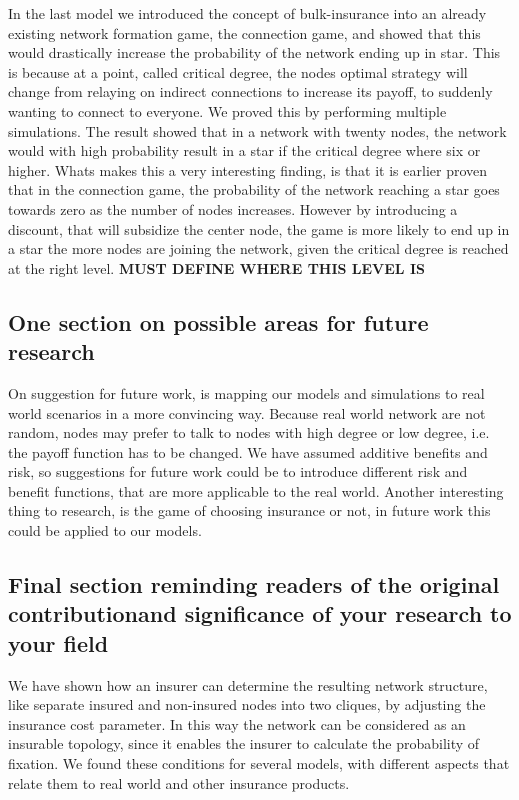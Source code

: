 In the last model we introduced the concept of bulk-insurance into an already existing network formation game, the connection game, and showed that this would drastically increase the probability of the network ending up in star. This is because at a point, called critical degree, the nodes optimal strategy will change from relaying on indirect connections to increase its payoff, to suddenly wanting to connect to everyone. 
We proved this by performing multiple simulations. The result showed that in a network with twenty nodes, the network would with high probability result in a star if the critical degree where six or higher. 
Whats makes this a very interesting finding, is that it is earlier proven that in the connection game, the probability of the network reaching a star goes towards zero as the number of nodes increases. However by introducing a discount, that will subsidize the center node, the game is more likely to end up in a star the more nodes are joining the network, given the critical degree is reached at the right level. \textbf{MUST DEFINE WHERE THIS LEVEL IS}

\subsection{One section on possible areas for future research}
On suggestion for future work, is mapping our models and simulations to real world scenarios in a more convincing way. Because real world network are not random, nodes may prefer to talk to nodes with high degree or low degree, i.e. the payoff function has to be changed. We have assumed additive benefits and risk, so suggestions for future work could be to introduce different risk and benefit functions, that are more applicable to the real world. 
Another interesting thing to research, is the game of choosing insurance or not, in future work this could be applied to our models.
 
\subsection{Final section reminding readers of the original contributionand significance of your research to your field}
We have shown how an insurer can determine the resulting network structure, like separate insured and non-insured nodes into two cliques, by adjusting the insurance cost parameter. In this way the network can be considered as an insurable topology, since it enables the insurer to calculate the probability of fixation. 
We found these conditions for several models, with different aspects that relate them to real world and other insurance products.

